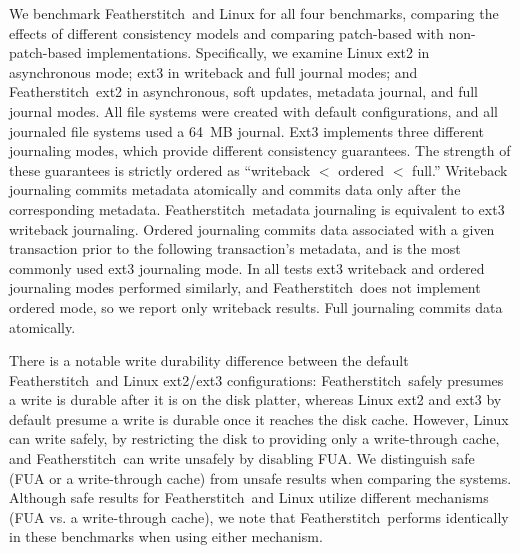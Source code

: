\documentclass[9pt,twocolumn,letterpaper]{article}
\newcommand{\Kudos}{Featherstitch}
\begin{document}
We benchmark \Kudos\ and Linux for all four benchmarks, comparing the
effects of different consistency models and comparing patch-based with
non-patch-based implementations.
%
Specifically, we examine Linux ext2 in asynchronous mode; ext3 in
writeback and full journal modes; and \Kudos\ ext2 in
asynchronous, soft updates, metadata journal, and full journal modes.  All
file systems were created with default configurations, and all journaled
file systems used a 64~MB journal.
%
Ext3 implements three different journaling modes, which provide different
consistency guarantees.
The strength of these guarantees is strictly ordered as
``writeback $<$ ordered $<$ full.''
Writeback journaling commits metadata atomically and commits data only
after the corresponding metadata. \Kudos\ metadata journaling is
equivalent to ext3 writeback journaling.
%
Ordered journaling commits data associated with a given transaction
prior to the following transaction's metadata, and is the most
commonly used ext3 journaling mode.
%
In all tests ext3 writeback and ordered journaling modes performed
similarly, and \Kudos\ does not implement ordered mode, so we report
only writeback results.
%
Full journaling commits data atomically.

There is a notable write durability difference between the default
\Kudos\ and Linux ext2/ext3 configurations: \Kudos\ safely presumes a write
is durable after it is on the disk platter, whereas Linux ext2 and
ext3 by default presume a write is durable once it reaches the disk cache.
However, Linux can write safely, by restricting the disk to providing only
a write-through cache, and \Kudos\ can write unsafely by disabling FUA.
%
We distinguish safe (FUA or a write-through cache) from unsafe results
when comparing the systems.
%
Although safe results for \Kudos\ and Linux utilize different
mechanisms (FUA vs. a write-through cache), we note that \Kudos\
performs identically in these benchmarks when using either mechanism.

\benchtable{}
\end{document}
